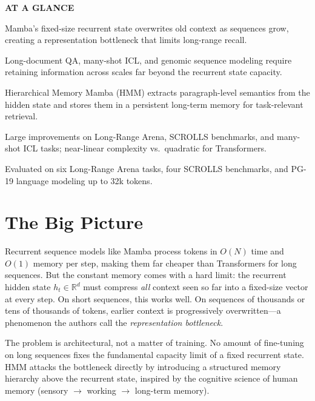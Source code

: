 \documentclass[10pt,twocolumn]{article}
\begin{document}
\begin{mdframed}[backgroundcolor=boxgray,linecolor=rulered,linewidth=1pt,
    innerleftmargin=6pt,innerrightmargin=6pt,
    innertopmargin=6pt,innerbottommargin=6pt]
\textbf{\small AT A GLANCE}\par\vspace{4pt}
\begin{description}[leftmargin=0pt,labelsep=4pt,itemsep=2pt,parsep=0pt,
    font=\small\bfseries]
  \item[Problem:] Mamba's fixed-size recurrent state overwrites old context as
    sequences grow, creating a representation bottleneck that limits long-range recall.
  \item[Why it matters:] Long-document QA, many-shot ICL, and genomic sequence modeling
    require retaining information across scales far beyond the recurrent state capacity.
  \item[Method:] Hierarchical Memory Mamba (HMM) extracts paragraph-level semantics
    from the hidden state and stores them in a persistent long-term memory for
    task-relevant retrieval.
  \item[Result:] Large improvements on Long-Range Arena, SCROLLS benchmarks, and
    many-shot ICL tasks; near-linear complexity vs.\ quadratic for Transformers.
  \item[Evidence:] Evaluated on six Long-Range Arena tasks, four SCROLLS benchmarks,
    and PG-19 language modeling up to 32k tokens.
\end{description}
\end{mdframed}

\section{The Big Picture}

Recurrent sequence models like Mamba process tokens in $O(N)$ time and $O(1)$ memory
per step, making them far cheaper than Transformers for long sequences. But the constant
memory comes with a hard limit: the recurrent hidden state $h_t \in \mathbb{R}^d$ must
compress \emph{all} context seen so far into a fixed-size vector at every step. On
short sequences, this works well. On sequences of thousands or tens of thousands of
tokens, earlier context is progressively overwritten---a phenomenon the authors call
the \emph{representation bottleneck}.

The problem is architectural, not a matter of training. No amount of fine-tuning on
long sequences fixes the fundamental capacity limit of a fixed recurrent state.
HMM attacks the bottleneck directly by introducing a structured memory hierarchy
above the recurrent state, inspired by the cognitive science of human memory
(sensory $\to$ working $\to$ long-term memory).
\end{document}
